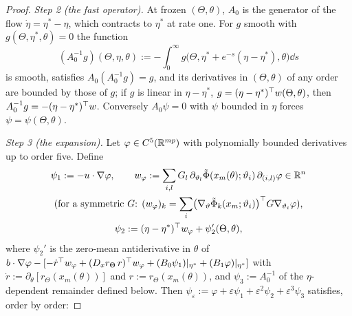 \begin{proof}
\smallskip
\emph{Step 2 (the fast operator).} At frozen $(\Theta,\theta)$, $A_0$ is the generator of the flow
$\dot\eta = \eta^* - \eta$, which contracts to $\eta^*$ at rate one. For $g$ smooth with $g(\Theta,\eta^*,\theta) = 0$
the function
\[
  (A_0^{-1}g)(\Theta,\eta,\theta) := -\int_0^\infty g\bigl(\Theta,\eta^* + e^{-s}(\eta - \eta^*),\theta\bigr)\dd s
\]
is smooth, satisfies $A_0(A_0^{-1}g) = g$, and its derivatives in $(\Theta,\theta)$ of any order are bounded by those
of $g$; if $g$ is linear in $\eta - \eta^*$, $g = (\eta - \eta^*)^\top w(\Theta,\theta)$, then
$A_0^{-1}g = -(\eta - \eta^*)^\top w$. Conversely $A_0\psi = 0$ with $\psi$ bounded in $\eta$ forces
$\psi = \psi(\Theta,\theta)$.

\smallskip
\emph{Step 3 (the expansion).} Let $\varphi\in C^5(\mathbb{R}^{mp})$ with polynomially bounded derivatives up to order five.
Define
\begin{gather*}
  \psi_1 := -u\cdot\nabla\varphi,\qquad
  w_\varphi := \sum_{i,l}G_l\,\partial_{\vartheta_l}\tilde\Phi(x_m(\theta);\vartheta_i)\,\partial_{(i,l)}\varphi\in\mathbb{R}^n\\
  \text{(for a symmetric $G$: $(w_\varphi)_k = \sum_i\bigl(\nabla_\vartheta\tilde\Phi_k(x_m;\vartheta_i)\bigr)^\top G\nabla_{\vartheta_i}\varphi$),}\\
  \psi_2 := (\eta - \eta^*)^\top w_\varphi + \psi_2'(\Theta,\theta),
\end{gather*}
where $\psi_2'$ is the zero-mean antiderivative in $\theta$ of
$b\cdot\nabla\varphi - [-\dot r^\top w_\varphi + (D_xr_\Theta\,r)^\top w_\varphi + (B_0\psi_1)|_{\eta^*} + (B_1\varphi)|_{\eta^*}]$
with $\dot r := \partial_\theta[r_\Theta(x_m(\theta))]$ and $r := r_\Theta(x_m(\theta))$, and $\psi_3 := A_0^{-1}$ of
the $\eta$-dependent remainder defined below. Then
$\psi_\varepsilon := \varphi + \varepsilon\psi_1 + \varepsilon^2\psi_2 + \varepsilon^3\psi_3$ satisfies, order by
order:
\end{proof}
